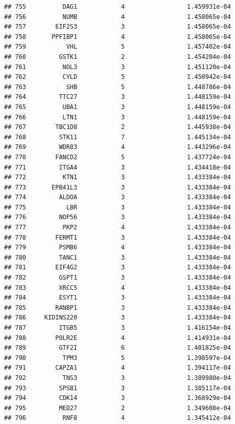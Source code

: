 \documentclass[
]{article}
\begin{document}
\begin{verbatim}
## 755          DAG1            4                 1.459931e-04
## 756          NUMB            4                 1.458065e-04
## 757        EIF2S3            3                 1.458065e-04
## 758       PPFIBP1            4                 1.458065e-04
## 759           VHL            5                 1.457402e-04
## 760         GSTK1            2                 1.454204e-04
## 761          NOL3            3                 1.451120e-04
## 762          CYLD            5                 1.450942e-04
## 763           SHB            5                 1.448786e-04
## 764         TTC27            3                 1.448159e-04
## 765          UBA1            3                 1.448159e-04
## 766          LTN1            3                 1.448159e-04
## 767        TBC1D8            2                 1.445938e-04
## 768         STK11            7                 1.445134e-04
## 769         WDR83            4                 1.443296e-04
## 770        FANCD2            5                 1.437724e-04
## 771         ITGA4            3                 1.434418e-04
## 772          KTN1            3                 1.433384e-04
## 773       EPB41L3            3                 1.433384e-04
## 774         ALDOA            3                 1.433384e-04
## 775           LBR            3                 1.433384e-04
## 776         NOP56            3                 1.433384e-04
## 777          PKP2            4                 1.433384e-04
## 778        FERMT1            3                 1.433384e-04
## 779         PSMB6            4                 1.433384e-04
## 780         TANC1            3                 1.433384e-04
## 781        EIF4G2            3                 1.433384e-04
## 782         GSPT1            3                 1.433384e-04
## 783         XRCC5            4                 1.433384e-04
## 784         ESYT1            3                 1.433384e-04
## 785        RANBP1            3                 1.433384e-04
## 786     KIDINS220            3                 1.433384e-04
## 787         ITGB5            3                 1.416154e-04
## 788        POLR2E            4                 1.414931e-04
## 789         GTF2I            6                 1.401825e-04
## 790          TPM3            5                 1.398597e-04
## 791        CAPZA1            4                 1.394117e-04
## 792          TNS3            3                 1.389980e-04
## 793         SPSB1            3                 1.385117e-04
## 794         CDK14            3                 1.368929e-04
## 795         MED27            2                 1.349608e-04
## 796          RNF8            4                 1.345412e-04

\end{verbatim}
\end{document}
